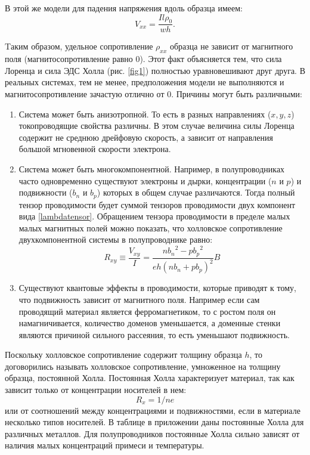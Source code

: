 В этой же модели для падения напряжения вдоль образца имеем:
\begin{equation}
V_{xx}=\frac{Il\rho_{0}}{wh}.
\label{DiagonalVoltage}
\end{equation}

Tаким образом, удельное сопротивление $\rho_{xx}$ образца не зависит от магнитного поля (магнитосопротивление равно 0). Этот факт объясняется тем, что сила Лоренца и сила ЭДС Холла (рис. \ref{fig1}) полностью уравновешивают друг друга. В реальных системах, тем не менее, предположения модели не выполняются и магнитосопротивление зачастую отлично от 0. Причины могут быть различными:
\begin{enumerate}
\item{Система может быть анизотропной. То есть в разных направлениях ($x,y,z$) токопроводящие свойства различны. В этом случае величина силы Лоренца содержит не среднюю дрейфовую скорость, а зависит от направления большой мгновенной скорости электрона.}

\item{Система может быть многокомпонентной. Например, в полупроводниках часто одновременно существуют электроны и дырки, концентрации ($n$ и $p$) и подвижности ($b_n$ и $b_p$) которых в общем случае различаются. Тогда полный тензор проводимости будет суммой тензоров проводимости двух компонент вида \ref{lambdatensor}. Обращением тензора проводимости в пределе малых малых магнитных полей можно показать, что холловское сопротивление двухкомпонентной системы в полупроводнике равно:
      \begin{equation}
      R_{xy}\equiv \frac{V_{xy}}{I}=\frac{n{b_n}^2-p{b_p}^2}{eh(nb_n+pb_p)^2}B
      \label{halltwocomponents}
      \end{equation}
      }

\item{Существуют квантовые эффекты в проводимости, которые приводят к тому, что подвижность зависит от магнитного поля. Например если сам проводящий материал является ферромагнетиком, то с ростом поля он намагничивается, количество доменов уменьшается, а доменные стенки являются причиной сильного рассеяния, то есть уменьшают подвижность. }
\end{enumerate}

Поскольку холловское сопротивление содержит толщину образца $h$, то договорились называть холловское сопротивление, умноженное на толщину образца, постоянной Холла. Постоянная Холла характеризует материал, так как зависит только от концентрации носителей в нем:
$$
R_x=1/ne
$$
 или от соотношений между концентрациями и подвижностями, если в материале несколько типов носителей. В таблице в приложении даны постоянные Холла для различных металлов. Для полупроводников постоянные Холла сильно зависят от наличия малых концентраций примеси и температуры.

